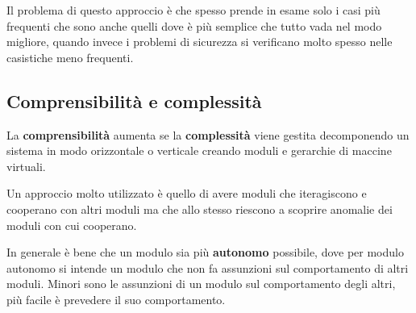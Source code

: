 Il problema di questo approccio è che spesso prende in esame solo i casi più frequenti che sono anche quelli dove è
più semplice che tutto vada nel modo migliore, quando invece i problemi di sicurezza si verificano molto spesso nelle
casistiche meno frequenti.

\subsection{Comprensibilità e complessità}
La \textbf{comprensibilità} aumenta se la \textbf{complessità} viene gestita decomponendo un sistema in modo
orizzontale o verticale creando moduli e gerarchie di maccine virtuali.

Un approccio molto utilizzato è quello di avere moduli che iteragiscono e cooperano con altri moduli ma che allo
stesso riescono a scoprire anomalie dei moduli con cui cooperano.

In generale è bene che un modulo sia più \textbf{autonomo} possibile, dove per modulo autonomo si intende un modulo
che non fa assunzioni sul comportamento di altri moduli. Minori sono le assunzioni di un modulo sul comportamento
degli altri, più facile è prevedere il suo comportamento.